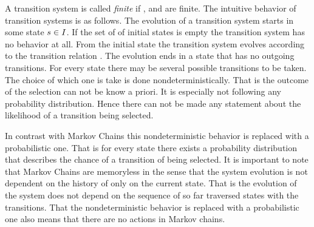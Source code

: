 \documentclass[preview]{standalone}
\begin{document}
A transition system is called \emph{finite} if \states, \atomicprops and  are finite. The intuitive behavior of transition systems is as follows. The evolution of a transition system starts in some state ${s} \in {I}$. If the set of \initstates of initial states is empty the transition system has no behavior at all. From the initial state the transition system evolves according to the transition relation \transitionrel. The evolution ends in a state that has no outgoing transitions. For every state there may be several possible transitions to be taken. The choice of which one is take is done nondeterministically. That is the outcome of the selection can not be know a priori. It is especially not following any probability distribution. Hence there can not be made any statement about the likelihood of a transition being selected.

In contrast with Markov Chains this nondeterministic behavior is replaced with a probabilistic one. That is for every state there exists a probability distribution that describes the chance of a transition of being selected. It is important to note that Markov Chains are memoryless in the sense that the system evolution is not dependent on the history of only on the current state. That is the evolution of the system does not depend on the sequence of so far traversed states with the transitions. That the nondeterministic behavior is replaced with a probabilistic one also means that there are no actions in Markov chains.
%
\end{document}

